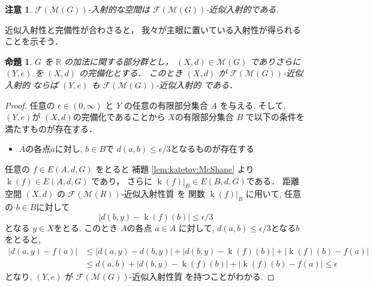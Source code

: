 \documentclass[leqno, 12pt]{jsarticle}
\newtheorem{prop}[thm]{命題}
\newtheorem*{rmk}{注意}
\newcommand{\rr}{\mathbb{R}}
\DeclareMathOperator{\kat}{k}
\begin{document}
\begin{rmk}
$\mathscr{F}(\mathscr{M}(G))$-入射的な空間は
$\mathscr{F}(\mathscr{M}(G))$-近似入射的である.
\end{rmk}



近似入射性と完備性が合わさると，
我々が主眼に置いている入射性が得られることを示そう．
\begin{prop}\label{prop:katetov:compapprxinj}
$G$
を
$\rr$
の加法に関する部分群とし，
$(X, d)\in \mathscr{M}(G)$
でありさらに
$(Y, e)$
を
$(X, d)$
の完備化とする．
このとき
$(X, d)$
が
$\mathscr{F}(\mathscr{M}(G))$-近似入射的
ならば
$(Y, e)$
も
$\mathscr{F}(\mathscr{M}(G))$-近似入射的
である．
\end{prop}
\begin{proof}
任意の
$\epsilon \in (0, \infty)$
と
$Y$
の任意の有限部分集合
$A$
を与える.
そして,
$(Y, e)$が
$(X, d)$の完備化であることから
$X$の有限部分集合
$B$
で以下の条件を満たすものが存在する．
\begin{itemize}
\item $A$の各点$a$に対し,
$b\in B$で
$d(a,b)\le \epsilon /3$となるものが存在する
\end{itemize}
任意の
$f\in E(A, d, G)$
をとると
補題
 \ref{lem:katetov:McShane}
 より
$\kat(f)\in E(A, d, G)$
であり，
さらに
$\kat(f)|_{B}\in E(B, d, G)$である．
距離空間
$(X, d)$
の
$\mathscr{F}(\mathscr{M}(R))$-近似入射性質
を
関数
$\kat(f)|_{B}$
に用いて, 
任意の
$b\in B$に対して
\[
|d(b,y)-\kat(f)(b)|\le \epsilon/3
\]
となる
$y\in X$をとる.
このとき
$A$の各点
$a\in A$
に対して,
$d(a,b)\le \epsilon/3$となる$b$をとると,
\begin{align*}
|d(a, y)-f(a)|&\le |d(a, y)-d(b, y)|+|d(b,y)-\kat(f)(b)|+|\kat(f)(b)-f(a)|\\
&\le d(a, b)+|d(b,y)-\kat(f)(b)|+|\kat(f)(b)-f(a)|
\le \epsilon
\end{align*}
となり,
$(Y, e)$
が
$\mathscr{F}(\mathscr{M}(G))$-近似入射性質
を持つことがわかる.
\end{proof}
\end{document}
